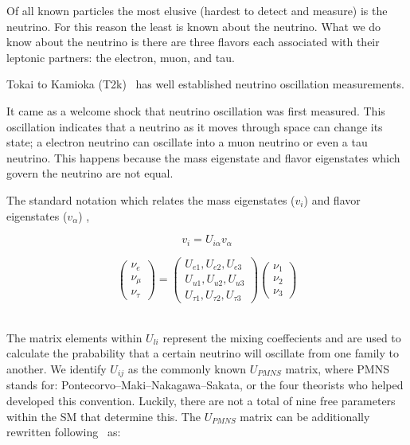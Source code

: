 Of all known particles the most elusive (hardest to detect and measure) is the neutrino.
For this reason the least is known about the neutrino.
What we do know about the neutrino is there are three flavors each associated with their leptonic partners: the electron, muon, and tau.

Tokai to Kamioka (T2k)~\citep{PhysRevD.91.072010_t2k_2015} has well established neutrino oscillation measurements.

It came as a welcome shock that neutrino oscillation was first measured.
This oscillation indicates that a neutrino as it moves through space can change its state; a electron neutrino can oscillate into a muon neutrino or even a tau neutrino.
This happens because the mass eigenstate and flavor eigenstates which govern the neutrino are not equal.

The standard notation which relates the mass eigenstates ($v_{i}$) and flavor eigenstates ($v_{\alpha}$) ,

\begin{equation}
  v_{i} = U_{i\alpha}v_{\alpha}
\end{equation}
\label{eq:relate_eigenstates}

\begin{equation}
\begin{pmatrix}
\nu_e\\
\nu_{\mu}\\
\nu_{\tau}
\end{pmatrix}
=
\begin{pmatrix}
U_{e1}, U_{e2}, U_{e3} \\
U_{u1}, U_{u2}, U_{u3} \\
U_{\tau1}, U_{\tau2}, U_{\tau3}
\end{pmatrix}
\begin{pmatrix}
\nu_1\\
\nu_2\\
\nu_3
\end{pmatrix}
\end{equation}
~\label{eq:mass_eigenstates}

The matrix elements within $U_{li}$ represent the mixing coeffecients and are used to calculate the prabability that a certain neutrino will oscillate from one family to another.
We identify $U_{ij}$ as the commonly known $U_{PMNS}$ matrix, where PMNS stands for: Pontecorvo–Maki–Nakagawa–Sakata, or the four theorists who helped developed this convention.
Luckily, there are not a total of nine free parameters within the SM that determine this.
The $U_{PMNS}$ matrix can be additionally rewritten following~\citep{Pontecorvo:1957qd, 1962PThPh..28..870M} as:

